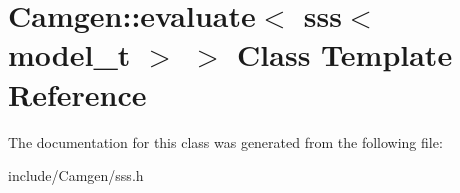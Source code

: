 \hypertarget{a00195}{\section{Camgen\-:\-:evaluate$<$ sss$<$ model\-\_\-t $>$ $>$ Class Template Reference}
\label{a00195}
}


The documentation for this class was generated from the following file\-:\begin{DoxyCompactItemize}
\item 
include/\-Camgen/sss.\-h\end{DoxyCompactItemize}
